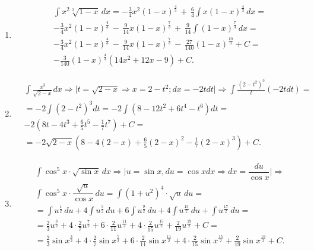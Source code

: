 \documentclass[a4paper, 12pt]{article}
\newcommand{\xint}[1]{\int#1\,dx}
\newcommand{\du}{\,du}
\newcommand{\uPowFr}[2]{\int u^{\frac{#1}{#2}} \du}
\newcommand{\multAndPowFrVar}[3]{\frac{#1}{#2}{#3}^{\frac{#2}{#1}}}
\newcommand{\multAndPowFrU}[2]{\multAndPowFrVar{#1}{#2}{u}}
\newcommand{\multAndPowFrSinX}[2]{\multAndPowFrVar{#1}{#2}{\sin{x}}}
\begin{document}
\begin{enumerate}
  \item %
  \begin{align*}
    &\int x^2\sqrt[3]{1-x}\,dx = -\frac{3}{4}x^2\left(1-x\right)^{\frac{4}{3}}\, +\, \frac{6}{4}\int x\left(1-x\right)^{\frac{4}{3}}\,dx = \\     
    &-\frac{3}{4}x^2\left(1-x\right)^{\frac{4}{3}}\, - \, \frac{9}{14}x\left(1-x\right)^{\frac{7}{3}}\, +\,\frac{9}{14}\int \left(1-x\right)^{\frac{7}{3}}\,dx = \\ 
    &-\frac{3}{4}x^2\left(1-x\right)^{\frac{4}{3}}\, - \, \frac{9}{14}x\left(1-x\right)^{\frac{7}{3}}\, -\, \frac{27}{140}\left(1-x\right)^{\frac{10}{3}} + C = \\ 
    &-\frac{3}{140}\left(1-x\right)^{\frac{4}{3}}\left(14x^2+12x-9\right)+C  
  .\end{align*}
  
  \item %
  \begin{align*}
    &\int{\frac{x^3}{\sqrt{2-x}}dx} 
    \Rightarrow \Big| t = \sqrt{2-x} \Rightarrow x = 2-t^2; dx = -2tdt \Big| \Rightarrow
    \int{\frac{(2-t^2)^3}{t}(-2tdt)} = \\
    &= -2\int{(2-t^2)^3dt} = 
    -2\int{(8-12t^2+6t^4-t^6)dt} = \\ 
    &-2(8t-4t^3+\frac{6}{5}t^5-\frac{1}{7}t^7)+C = \\
    &= -2\sqrt{2-x}(8-4(2-x)+\frac{6}{5}(2-x)^2-\frac{1}{7}(2-x)^3)+ C
  .\end{align*}
    
  \item %
  \begin{align*}
    &\xint{\cos^{5}x\cdot\sqrt{\sin{x}}} \Rightarrow 
    \Big| u = \sin x, du = \cos x dx \Rightarrow dx = \dfrac{du}{\cos{x}} \Big|
    \Rightarrow \\
    &\int \cos^5{x} \cdot \dfrac{\sqrt{u}}{\cos{x}}\du =
    \int (1+u^2)^4 \cdot \sqrt{u}\du = \\
    &= \uPowFr{1}{2} + 4\uPowFr{5}{2} + 6\uPowFr{9}{2} + 4\uPowFr{13}{2} + \uPowFr{17}{2} = \\
    &= \multAndPowFrU{2}{3} + 4\cdot \multAndPowFrU{2}{7} + 6\cdot \multAndPowFrU{2}{11}
      + 4\cdot \multAndPowFrU{2}{15} + \multAndPowFrU{2}{19} + C = \\
    &= \multAndPowFrSinX{2}{3} + 4\cdot \multAndPowFrSinX{2}{7} + 6\cdot \multAndPowFrSinX{2}{11}
      + 4\cdot \multAndPowFrSinX{2}{15} + \multAndPowFrSinX{2}{19} + C
  .\end{align*}
 

\end{enumerate}
\end{document}
